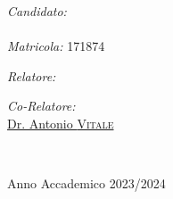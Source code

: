 \documentclass[
11pt, %
oneside, %
english, %
onehalfspacing,%
headsepline, %
]{MastersDoctoralThesis} %
\begin{document}
\begin{titlepage}
\begin{center}
			\begin{minipage}[t]{0.95\textwidth}
					\Large \emph{Candidato:} \\
					{\authorname}\\[0.1cm] %
					\emph{Matricola:} {171874} 
			\end{minipage}
			\begin{minipage}[t]{0.95\textwidth}
				\begin{flushright} \Large
					\emph{Relatore:}\\
					\href{https://dibt.unimol.it/staff/sscalabrino/home/}{\supname} %
					\begin{flushright} \Large
						\emph{Co-Relatore:}\\
						\href{https://scholar.google.com/citations?user=AdVTnyQAAAAJ&hl=it}{Dr. Antonio \textsc{Vitale}} %
					\end{flushright} 
				\end{flushright}
				
			\end{minipage}\\[1.5cm]
			
			\vfill
			
			\centerline{\Large Anno Accademico 2023/2024}
		\end{center}
	\end{titlepage}
\end{document}

